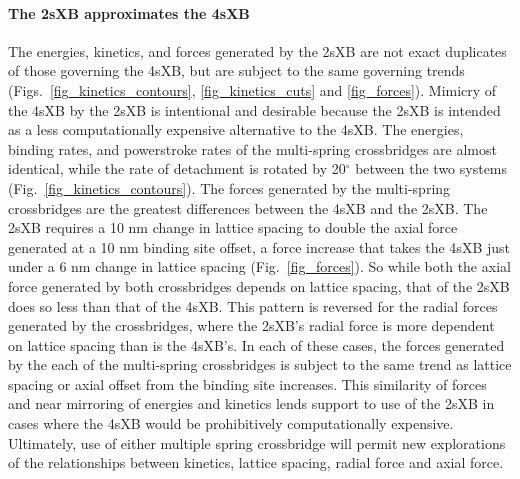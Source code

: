 \documentclass[]{article}
\begin{document}
\paragraph{The 2sXB approximates the 4sXB} %
The energies, kinetics, and forces generated by the 2sXB are not exact duplicates of those governing the 4sXB, but are subject to the same governing trends (Figs.~\ref{fig_kinetics_contours}, \ref{fig_kinetics_cuts} and \ref{fig_forces}). 
Mimicry of the 4sXB by the 2sXB is intentional and desirable because the 2sXB is intended as a less computationally expensive alternative to the 4sXB. 
The energies, binding rates, and powerstroke rates of the multi-spring crossbridges are almost identical, while the rate of detachment is rotated by 20$^\circ$ between the two systems (Fig.~\ref{fig_kinetics_contours}).
The forces generated by the multi-spring crossbridges are the greatest differences between the 4sXB and the 2sXB.
The 2sXB requires a 10 nm change in lattice spacing to double the axial force generated at a 10 nm binding site offset, a force increase that takes the 4sXB just under a 6 nm change in lattice spacing (Fig.~\ref{fig_forces}). 
So while both the axial force generated by both crossbridges depends on lattice spacing, that of the 2sXB does so less than that of the 4sXB.
This pattern is reversed for the radial forces generated by the crossbridges, where the 2sXB's radial force is more dependent on lattice spacing than is the 4sXB's.
In each of these cases, the forces generated by the each of the multi-spring crossbridges is subject to the same trend as lattice spacing or axial offset from the binding site increases.
This similarity of forces and near mirroring of energies and kinetics lends support to use of the 2sXB in cases where the 4sXB would be prohibitively computationally expensive.
Ultimately, use of either multiple spring crossbridge will permit new explorations of the relationships between kinetics, lattice spacing, radial force and axial force.
\end{document}
